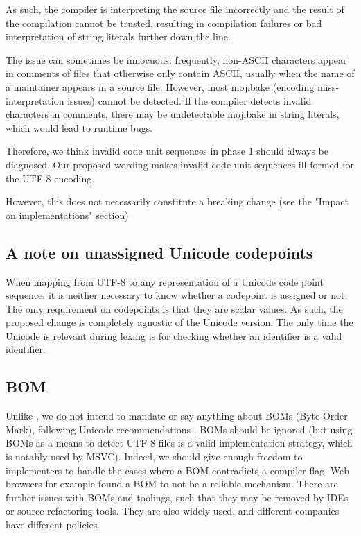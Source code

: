 \documentclass{wg21}
\begin{document}
As such, the compiler is interpreting the source file incorrectly and the result of the compilation cannot be trusted,
resulting in compilation failures or bad interpretation of string literals further down the line.

The issue can sometimes be innocuous:
frequently, non-ASCII characters appear in comments of files that otherwise only contain ASCII, usually when the name of
a maintainer appears in a source file.
However, most mojibake (encoding miss-interpretation issues) cannot be detected. If the compiler detects invalid characters in comments, there may be undetectable
mojibake in string literals, which would lead to runtime bugs.

Therefore, we think invalid code unit sequences in phase 1 should always be diagnosed.
Our proposed wording makes invalid code unit sequences ill-formed for the UTF-8 encoding.

However, this does not necessarily constitute a breaking change (see the "Impact on implementations" section)

\subsection{A note on unassigned Unicode codepoints}

When mapping from UTF-8 to any representation of a Unicode code point sequence, it is neither necessary to know
whether a codepoint is assigned or not.
The only requirement on codepoints is that they are scalar values.
As such, the proposed change is completely agnostic of the Unicode version.
The only time the Unicode is relevant during lexing is for checking whether an identifier is a valid identifier.

\subsection{BOM}

Unlike , we do not intend to mandate or say anything about BOMs (Byte Order Mark), following Unicode recommendations \cite{BOM}.
BOMs should be ignored (but using BOMs as a means to detect UTF-8 files is a valid implementation strategy, which is notably used by MSVC).
Indeed, we should give enough freedom to implementers to handle the cases where a BOM contradicts a compiler flag.
Web browsers for example found a BOM to not be a reliable mechanism.
There are further issues with BOMs and toolings, such that they may be removed by IDEs or source refactoring tools.
They are also widely used, and different companies have different policies.
\end{document}

